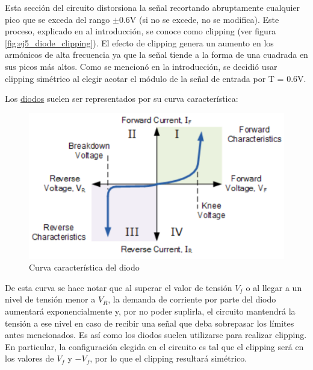 \documentclass[../../main.tex]{subfiles}
\begin{document}
Esta secci\'on del circuito distorsiona la se\~nal recortando abruptamente cualquier pico que se exceda del rango $\pm$0.6V (si no se excede, no se modifica). Este proceso, explicado en al introducción, se conoce como clipping (ver figura \ref{fig:ej5_diode_clipping}).
El efecto de clipping genera un aumento en los arm\'onicos de alta frecuencia ya que la se\~nal tiende a la forma de una cuadrada en sus picos más altos. Como se mencionó en la introducción, se decidi\'o usar clipping sim\'etrico al elegir acotar el módulo de la señal de entrada por T = 0.6V.

Los \underline{diodos} suelen ser representados por su curva característica:

\begin{figure}[H]	%
	\centering
	\includegraphics[scale=0.5]{imagenes/diode_curva.png}
	\caption{Curva característica del diodo}
	\label{fig:ej5_diode_curva}
\end{figure}

De esta curva se hace notar que al superar el valor de tensión $V_f$ o al llegar a un nivel de tensión menor a $V_R$, la demanda de corriente por parte del diodo aumentará exponencialmente y, por no poder suplirla, el circuito mantendrá la tensión a ese nivel en caso de recibir una señal que deba sobrepasar los límites antes mencionados. Es así como los diodos suelen utilizarse para realizar clipping. En particular, la configuración elegida en el circuito es tal que el clipping será en los valores de $V_f$ y $-V_f$, por lo que el clipping resultará simétrico.  
\end{document}
